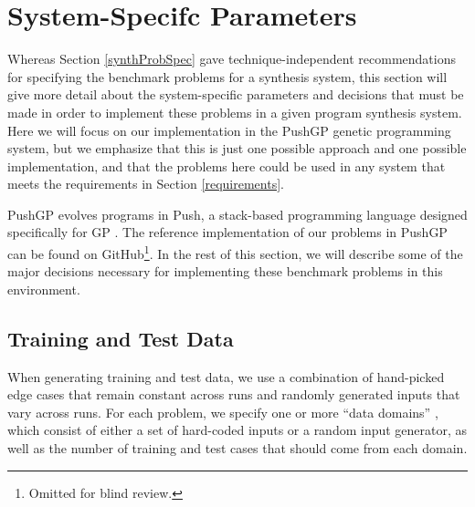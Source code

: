 \documentclass{sig-alternate}
\begin{document}
\section{System-Specifc Parameters} \label{systemParamsSection}

Whereas Section \ref{synthProbSpec} gave technique-independent recommendations for specifying the benchmark problems for a synthesis system, this section will give more detail about the system-specific parameters and decisions that must be made in order to implement these problems in a given program synthesis system. Here we will focus on our implementation in the PushGP genetic programming system, but we emphasize that this is just one possible approach and one possible implementation, and that the problems here could be used in any system that meets the requirements in Section \ref{requirements}.

PushGP evolves programs in Push, a stack-based programming language designed specifically for GP \cite{spector:2002:GPEM, 1068292}. %
The reference implementation of our problems in PushGP can be found on GitHub\footnote{Omitted for blind review.}. In the rest of this section, we will describe some of the major decisions necessary for implementing these benchmark problems in this environment.

\subsection{Training and Test Data}

When generating training and test data, we use a combination of hand-picked edge cases that remain constant across runs and randomly generated inputs that vary across runs. For each problem, we specify one or more ``data domains'' \cite{Helmuth:2014:GECCO}, which consist of either a set of hard-coded inputs or a random input generator, as well as the number of training and test cases that should come from each domain. %
\end{document}
